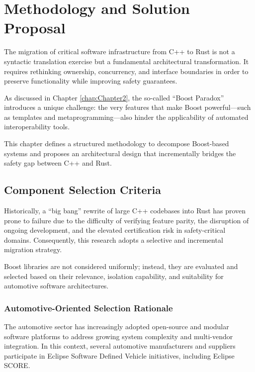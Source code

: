         \chapter{Methodology and Solution Proposal}
        \label{chap:Chapter3}

        The migration of critical software infrastructure from C++ to Rust is not a
        syntactic translation exercise but a fundamental architectural transformation.
        It requires rethinking ownership, concurrency, and interface boundaries in order
        to preserve functionality while improving safety guarantees.

        As discussed in Chapter \ref{chap:Chapter2}, the so-called ``Boost Paradox''
        introduces a unique challenge: the very features that make Boost powerful—such as
        templates and metaprogramming—also hinder the applicability of automated
        interoperability tools.

        This chapter defines a structured methodology to decompose Boost-based systems
        and proposes an architectural design that incrementally bridges the safety gap
        between C++ and Rust.

        \section{Component Selection Criteria}
        \label{sec:SelectionCriteria}

        Historically, a ``big bang'' rewrite of large C++ codebases into Rust has proven
        prone to failure due to the difficulty of verifying feature parity, the
        disruption of ongoing development, and the elevated certification risk in
        safety-critical domains. Consequently, this research adopts a selective and
        incremental migration strategy.

        Boost libraries are not considered uniformly; instead, they are evaluated and
        selected based on their relevance, isolation capability, and suitability for
        automotive software architectures.

        \subsection{Automotive-Oriented Selection Rationale}

        The automotive sector has increasingly adopted open-source and modular software
        platforms to address growing system complexity and multi-vendor integration. In
        this context, several automotive manufacturers and suppliers participate in
        Eclipse Software Defined Vehicle initiatives, including Eclipse \gls{SCORE}.

